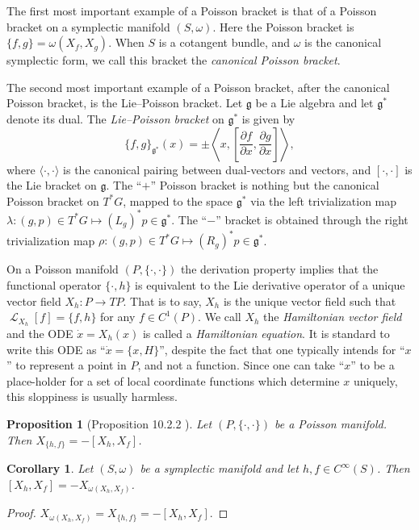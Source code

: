 \documentclass[12pt]{amsart}
\newcommand{\pder}[2]{\ensuremath{\frac{\partial #1}{\partial #2}}}
\newtheorem{prop}[thm]{Proposition}
\newtheorem{cor}[thm]{Corollary}
\DeclareMathOperator{\lie}{\mathcal{L}}
\begin{document}
The first most important example of a Poisson bracket is
that of a Poisson bracket on a symplectic manifold $(S,\omega)$.
Here the Poisson bracket is $\{ f , g \} = \omega( X_f , X_g )$.
When $S$ is a cotangent bundle, and $\omega$ is the canonical
symplectic form, we call this bracket the \emph{canonical Poisson
bracket}.

The second most important example of a Poisson bracket,
after the canonical Poisson bracket,
is the Lie--Poisson bracket.  Let $\mathfrak{g}$ be a Lie algebra
and let $\mathfrak{g}^*$ denote its dual.
The \emph{Lie--Poisson bracket} on $\mathfrak{g}^*$ is given 
by
\begin{equation}
  \{ f , g \}_{\mathfrak{g}^*}( x ) = \pm
  \left \langle x , \left[ \pder{f}{x} , \pder{g}{x} \right] \right \rangle, 
  \label{eq:Lie-Poisson}
\end{equation}
where $\langle \cdot , \cdot \rangle$ is the canonical pairing between
dual-vectors and vectors, and $[ \cdot , \cdot ]$ is the Lie bracket
on $\mathfrak{g}$.
The ``$+$'' Poisson bracket is nothing but the canonical Poisson bracket on $T^*G$,
mapped to the space $\mathfrak{g}^*$ via the left trivialization map $\lambda: (g,p) \in T^*G \mapsto (L_g)^*p \in \mathfrak{g}^*$.
The ``$-$'' bracket is obtained through the right trivialization map
$\rho:(g,p) \in T^*G \mapsto (R_g)^*p \in \mathfrak{g}^*$.

On a Poisson manifold $(P,\{ \cdot , \cdot \})$
the derivation property implies that the functional operator
$\{ \cdot , h \}$ is equivalent
to the Lie derivative operator of a unique vector field $X_h:P \to TP$.
That is to say, $X_h$ is the unique vector field such that $\lie_{X_h}[f] = \{ f , h \}$ for any $f \in C^1(P)$.
We call $X_h$ the \emph{Hamiltonian vector field} and the ODE $\dot{x} = X_h(x)$ is called a \emph{Hamiltonian equation}.
It is standard to write this ODE as ``$\dot{x} = \{ x , H\}$'',
despite the fact that one typically intends for ``$x$'' to represent
a point in $P$, and not a function.
Since one can take ``$x$'' to be a place-holder for a set of
local coordinate functions which determine $x$ uniquely, this
sloppiness is usually harmless.

\begin{prop}[Proposition 10.2.2 \cite{MandS}] \label{prop:Lie_hom}
  Let $(P,\{ \cdot , \cdot \})$ be a Poisson manifold.
  Then $X_{ \{ h ,f \} } = - [X_h , X_f ]$.
\end{prop}

\begin{cor} \label{cor:Lie_hom}
  Let $(S,\omega)$ be a symplectic manifold
  and let $h,f \in C^{\infty}(S)$.
  Then $[X_h , X_f] = -X_{\omega(X_h,X_f) }$.
\end{cor}
\begin{proof}
  $X_{\omega(X_h,X_f)} = X_{ \{h,f\} } = -[X_h , X_f]$.
\end{proof}
\end{document}

